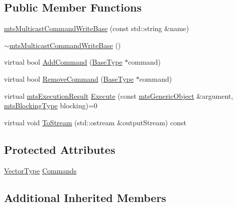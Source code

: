 \subsection*{Public Member Functions}
\begin{DoxyCompactItemize}
\item 
\hyperlink{classmts_multicast_command_write_base_a03fecc30b28f9ae0623eb8a8ba36c5d2}{mts\+Multicast\+Command\+Write\+Base} (const std\+::string \&name)
\item 
\hyperlink{classmts_multicast_command_write_base_af80f325cb7023dcef286ecaafe189841}{$\sim$mts\+Multicast\+Command\+Write\+Base} ()
\item 
virtual bool \hyperlink{classmts_multicast_command_write_base_a7163c96ed8d25927ea074bacfae410e1}{Add\+Command} (\hyperlink{classmts_command_write_base_a5d78c8590cfc73fa29d93b3678cba199}{Base\+Type} $\ast$command)
\item 
virtual bool \hyperlink{classmts_multicast_command_write_base_a2dd321ec3867b87877a7d8875e4dc896}{Remove\+Command} (\hyperlink{classmts_command_write_base_a5d78c8590cfc73fa29d93b3678cba199}{Base\+Type} $\ast$command)
\item 
virtual \hyperlink{classmts_execution_result}{mts\+Execution\+Result} \hyperlink{classmts_multicast_command_write_base_ab8a9cde81c9d5653defafd2093383a51}{Execute} (const \hyperlink{classmts_generic_object}{mts\+Generic\+Object} \&argument, \hyperlink{mts_forward_declarations_8h_ad7426ccb6c883bc780d0ee197dddcbe7}{mts\+Blocking\+Type} blocking)=0
\item 
virtual void \hyperlink{classmts_multicast_command_write_base_a1a82c8eadcc87d4617302be657120876}{To\+Stream} (std\+::ostream \&output\+Stream) const 
\end{DoxyCompactItemize}
\subsection*{Protected Attributes}
\begin{DoxyCompactItemize}
\item 
\hyperlink{classmts_multicast_command_write_base_a25953a3da11d172a87774cfebe55eaa9}{Vector\+Type} \hyperlink{classmts_multicast_command_write_base_a908fccc3c249bf9a0919f2294defc73e}{Commands}
\end{DoxyCompactItemize}
\subsection*{Additional Inherited Members}


